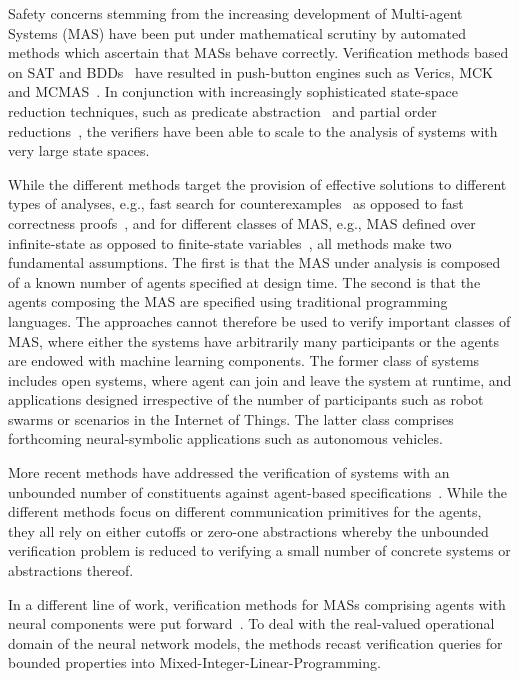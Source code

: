 Safety concerns stemming from the increasing development of Multi-agent Systems
(MAS) have been put under mathematical scrutiny
by automated methods which ascertain that MASs behave correctly. Verification
methods based on SAT and
BDDs~\cite{KacprzakLomuscioPenczek04b,RaimondiLomuscio05c} have resulted in
push-button engines such as Verics, MCK and
MCMAS~\cite{GammieMeyden04a,Kacprzak+07a,LomuscioQuRaimondi15}.  In conjunction
with increasingly sophisticated state-space reduction techniques, such as
predicate abstraction~\cite{lomuscio2015verifying} and partial order
reductions~\cite{jamroga2020towards}, the verifiers have been able to scale to
the analysis of systems with very large state spaces.


While the different methods target the provision of effective solutions to
different types of analyses, e.g., fast search for
counterexamples~\cite{penczek2003verifying} as opposed to fast correctness
proofs~\cite{ball2006abstraction}, and for different classes of MAS, e.g., MAS
defined over infinite-state as opposed to finite-state
variables~\cite{lomuscio2015verifying}, all methods make two fundamental
assumptions. The first is that the MAS under analysis is composed of a known
number of agents specified at design time. The second is that the agents
composing the MAS are specified using traditional programming languages.  The
approaches cannot
therefore be used to verify important classes of MAS, where either the systems
have arbitrarily many participants or the agents are endowed with machine
learning components. The former class of systems includes open systems, where
agent can join and leave the system at runtime, and applications designed
irrespective of the number of participants such as robot swarms or scenarios
in the Internet of Things. The latter class comprises forthcoming
neural-symbolic applications such as autonomous vehicles.

More recent methods have addressed the verification of systems with an unbounded
number of constituents against agent-based
specifications~\cite{KouvarosLomuscio16a,KouvarosLomuscio15b,KouvarosLomuscio16c}.
While the different methods focus on different communication primitives for the
agents, they all rely on either cutoffs or zero-one abstractions whereby
the unbounded verification problem is reduced to verifying a small
number of concrete systems or abstractions thereof.  

In a different line of work, verification methods for MASs comprising agents
with neural components were put forward~\cite{Akintunde+20b,Akintunde+22}. To
deal with the real-valued operational domain of the neural network models, the
methods recast verification queries for bounded properties into
Mixed-Integer-Linear-Programming.

